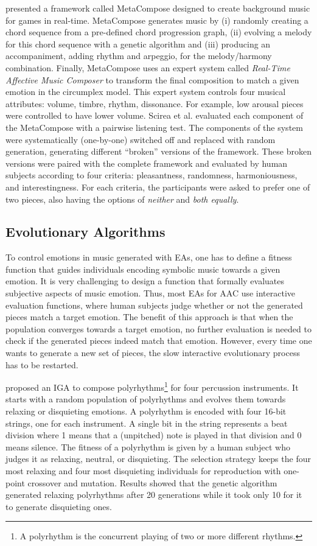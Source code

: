 \citet{scirea2017affective} presented a framework called MetaCompose designed to create background music for games in real-time. MetaCompose generates music by (i) randomly creating a chord sequence from a pre-defined chord progression graph, (ii) evolving a melody for this chord sequence with a genetic algorithm and (iii) producing an accompaniment, adding rhythm and arpeggio, for the melody/harmony combination. Finally, MetaCompose uses an expert system called \textit{Real-Time Affective Music Composer} to transform the final composition to match a given emotion in the circumplex model. This expert system controls four musical attributes: volume, timbre, rhythm, dissonance. For example, low arousal pieces were controlled to have lower volume. Scirea et al. \cite{scirea2017affective} evaluated each component of the MetaCompose with a pairwise listening test. The components of the system were systematically (one-by-one) switched off and replaced with random generation, generating different ``broken'' versions of the framework. These broken versions were paired with the complete framework and evaluated by human subjects according to four criteria: pleasantness, randomness, harmoniousness, and interestingness. For each criteria, the participants were asked to prefer one of two pieces, also having the options of \textit{neither} and \textit{both equally}.

\subsection{Evolutionary Algorithms}

To control emotions in music generated with EAs, one has to define a fitness function that guides individuals encoding symbolic music towards a given emotion. It is very challenging to design a function that formally evaluates subjective aspects of music emotion. Thus, most EAs for AAC use interactive evaluation functions, where human subjects judge whether or not the generated pieces match a target emotion. The benefit of this approach is that when the population converges towards a target emotion, no further evaluation is needed to check if the generated pieces indeed match that emotion. However, every time one wants to generate a new set of pieces, the slow interactive evolutionary process
has to be restarted.

\citet{kim2004composing} proposed an IGA to compose polyrhythms\footnote{A polyrhythm is the concurrent playing of two or more different rhythms.} for four percussion instruments. It starts with a random population of polyrhythms and evolves them towards relaxing or disquieting emotions. A polyrhythm is encoded with four 16-bit strings, one for each instrument. A single bit in the string represents a beat division where 1 means that a (unpitched) note is played in that division and 0 means silence. The fitness of a polyrhythm is given by a human subject who judges it as relaxing, neutral, or disquieting. The selection strategy keeps the four most relaxing and four most disquieting individuals for reproduction with one-point crossover and mutation. Results showed that the genetic algorithm generated relaxing polyrhythms after 20 generations while it took only 10 for it to generate disquieting ones.

